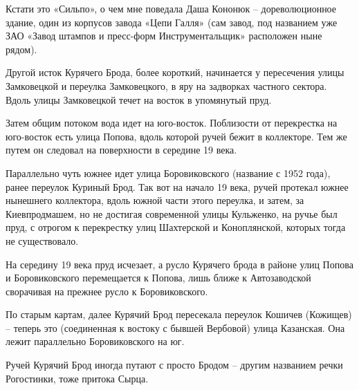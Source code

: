 Кстати это «Сильпо», о чем мне поведала Даша Кононюк – дореволюционное здание, один из корпусов завода «Цепи Галля» (сам завод, под названием уже ЗАО «Завод штампов и пресс-форм Инструментальщик»  расположен ныне рядом).


Другой исток Курячего Брода, более короткий, начинается у пересечения улицы Замковецкой и переулка Замковецкого, в яру на задворках частного сектора. Вдоль улицы Замковецкой течет на восток в упомянутый пруд. 

Затем общим потоком вода идет на юго-вос\-ток. Поблизости от перекрестка на юго-восток есть улица Попова, вдоль которой ручей бежит в коллекторе. Тем же путем он следовал на поверхности в середине 19 века.

Параллельно чуть южнее идет улица Боровиковского (название с 1952 года), ранее переулок Куриный Брод. Так вот на начало 19 века, ручей протекал южнее нынешнего коллектора, вдоль южной части этого переулка, и затем, за Киевпродмашем, но не достигая современной улицы Кульженко, на ручье был пруд, с отрогом к перекрестку улиц Шахтерской и Коноплянской, которых тогда не существовало.

На середину 19 века пруд исчезает, а русло Курячего брода в районе улиц Попова и Боровиковского перемещается к Попова, лишь ближе к Автозаводской сворачивая на прежнее русло к Боровиковского.

По старым картам, далее Курячий Брод пересекала переулок Кошичев (Кожищев) – теперь это (соединенная к востоку с бывшей Вербовой) улица Казанская. Она лежит параллельно Боровиковского на юг.

Ручей Курячий Брод иногда путают с просто Бродом – другим названием речки Рогостинки, тоже притока Сырца. 
